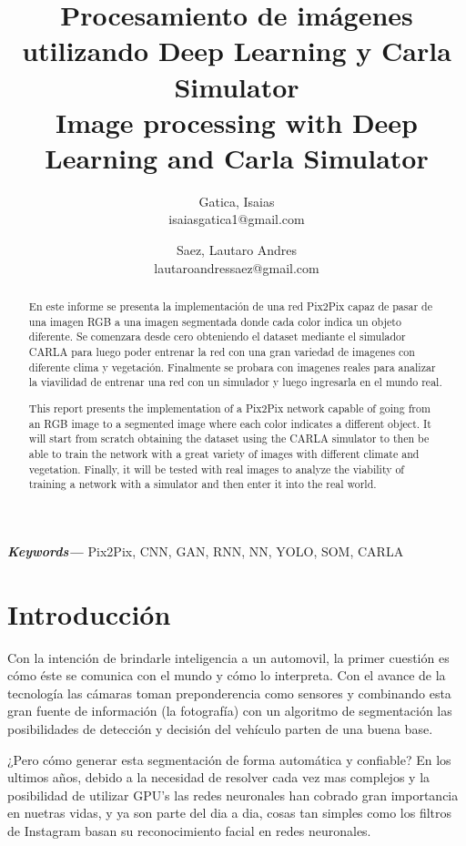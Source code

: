 \documentclass[]{IEEEtran}
\title{Procesamiento de imágenes utilizando Deep Learning y Carla 
Simulator \\ 
Image processing with Deep Learning and Carla Simulator}
\author{ 
Gatica, Isaias \\ { \small{isaiasgatica1@gmail.com} }\\ \and 
Saez, Lautaro Andres { \\ \small{lautaroandressaez@gmail.com } } }
\date{}
\providecommand{\keywords}[1]
{
  \small	
  \textbf{\textit{Keywords---}} #1
}
\begin{document}
    \maketitle

    \begin{abstract}
        En este informe se presenta la implementación de una red Pix2Pix capaz de pasar de una imagen RGB a 
        una imagen segmentada donde cada color indica un objeto diferente. Se comenzara desde cero obteniendo el 
        dataset mediante el simulador CARLA para luego poder entrenar la red con una gran variedad de imagenes con 
        diferente clima y vegetación. Finalmente se probara con imagenes reales para analizar la viavilidad de entrenar una 
        red con un simulador y luego ingresarla en el mundo real.
    \end{abstract}


    \begin{abstract}
        This report presents the implementation of a Pix2Pix network capable of going from an RGB image to
        a segmented image where each color indicates a different object. It will start from scratch obtaining the
        dataset using the CARLA simulator to then be able to train the network with a great variety of images with
        different climate and vegetation. Finally, it will be tested with real images to analyze the viability of training a
        network with a simulator and then enter it into the real world.
    \end{abstract}

    \keywords{Pix2Pix, CNN, GAN, RNN, NN, YOLO, SOM, CARLA}


    \section{Introducción}

    Con la intención de brindarle inteligencia a un automovil, la primer cuestión es cómo éste se comunica con el mundo y cómo lo interpreta.
    Con el avance de la tecnología las cámaras toman preponderencia como sensores y combinando esta gran fuente de información (la fotografía) con un 
    algoritmo de segmentación las posibilidades de detección y decisión del vehículo parten de una buena base. 

    ¿Pero cómo generar esta segmentación de forma automática y confiable? En los ultimos años, debido a la necesidad de resolver cada vez mas complejos y la posibilidad de utilizar GPU's las redes neuronales han cobrado 
    gran importancia en nuetras vidas, y ya son parte del dia a dia, cosas tan simples como los filtros de Instagram basan 
    su reconocimiento facial en redes neuronales. 
\end{document}
